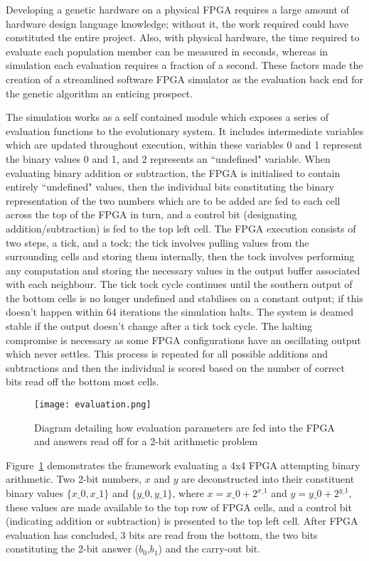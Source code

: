 Developing a genetic hardware on a physical FPGA requires a large amount of hardware
design language knowledge; without it, the work required could have constituted the
entire project. Also, with physical hardware, the time required to evaluate each
population member can be measured in seconds, whereas in simulation each evaluation
requires a fraction of a second. These factors made the creation of a
streamlined software FPGA simulator as the evaluation back end for the
genetic algorithm an enticing prospect.

The simulation works as a self contained module which exposes a series of
evaluation functions to the evolutionary system.
It includes intermediate variables which are updated throughout
execution, within these variables 0 and 1 represent the binary values
0 and 1, and 2 represents an ``undefined" variable.
When evaluating binary
addition or subtraction, the FPGA is initialised to contain entirely ``undefined"
values, then the individual bits constituting the binary representation of the two numbers
which are to be added are fed
to each cell across the top of the FPGA in turn, and a control bit
(designating addition/subtraction) is fed to the top left cell. The FPGA execution consists of
two steps, a tick, and a tock; the tick involves pulling values from the surrounding
cells and storing them internally, then the tock involves performing any computation
and storing the necessary values in the output buffer associated with each neighbour.
The tick tock
cycle continues until the southern output of the bottom cells is no longer undefined
and stabilises on a constant output; if this doesn't happen within 64 iterations
the simulation halts. The system is deamed stable if the output doesn't change after
a tick tock cycle.
The halting compromise is necessary as some FPGA configurations
have an oscillating output which never settles. This process is repeated for all possible
additions and subtractions and then the individual is scored based on the number
of correct bits read off the bottom most cells.

\begin{figure}
\centering
\texttt{[image: evaluation.png]}
\caption{Diagram detailing how evaluation parameters are fed into the FPGA and answers
read off for a 2-bit arithmetic problem}
\label{fig:control}
\end{figure}

Figure~\ref{fig:control} demonstrates the framework evaluating a 4x4 FPGA attempting
binary arithmetic. Two 2-bit numbers, $x$ and $y$ are deconstructed into their constituent
binary values $\{x\_0,x\_1\}$ and $\{y\_0,y\_1\}$, where $x = x\_0 + 2^{x\_1}$ and $y = y\_0 + 2^{y\_1}$,
these values are made available
to the top row of FPGA cells, and a
control bit (indicating addition or subtraction) is presented to the top left cell.
After FPGA evaluation has concluded, 3 bits are read from the bottom, the two bits
constituting the 2-bit answer ($b_0$,$b_1$) and the carry-out bit.

